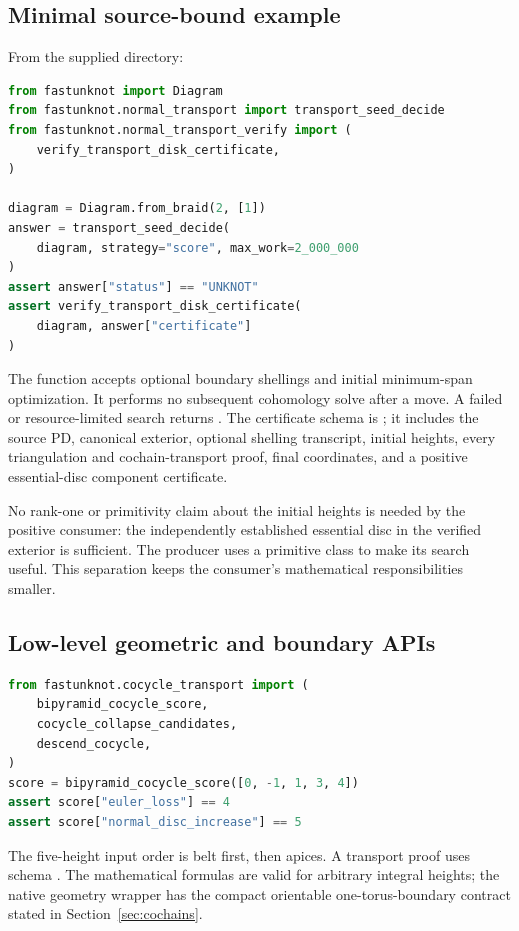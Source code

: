 \subsection{Minimal source-bound example}

From the supplied  directory:
\begin{lstlisting}[language=Python]
from fastunknot import Diagram
from fastunknot.normal_transport import transport_seed_decide
from fastunknot.normal_transport_verify import (
    verify_transport_disk_certificate,
)

diagram = Diagram.from_braid(2, [1])
answer = transport_seed_decide(
    diagram, strategy="score", max_work=2_000_000
)
assert answer["status"] == "UNKNOT"
assert verify_transport_disk_certificate(
    diagram, answer["certificate"]
)
\end{lstlisting}

The function accepts optional boundary shellings and initial minimum-span
optimization. It performs no subsequent cohomology solve after a move.
A failed or resource-limited search returns . The
certificate schema is ; it includes the
source PD, canonical exterior, optional shelling transcript, initial
heights, every triangulation and cochain-transport proof, final coordinates,
and a positive essential-disc component certificate.

No rank-one or primitivity claim about the initial heights is needed by
the positive consumer: the independently established essential disc in
the verified exterior is sufficient. The producer uses a primitive class
to make its search useful. This separation keeps the consumer's
mathematical responsibilities smaller.

\subsection{Low-level geometric and boundary APIs}

\begin{lstlisting}[language=Python]
from fastunknot.cocycle_transport import (
    bipyramid_cocycle_score,
    cocycle_collapse_candidates,
    descend_cocycle,
)
score = bipyramid_cocycle_score([0, -1, 1, 3, 4])
assert score["euler_loss"] == 4
assert score["normal_disc_increase"] == 5
\end{lstlisting}

The five-height input order is belt first, then apices. A transport proof
uses schema . The mathematical formulas
are valid for arbitrary integral heights; the native geometry wrapper
has the compact orientable one-torus-boundary contract stated in
Section~\ref{sec:cochains}.

